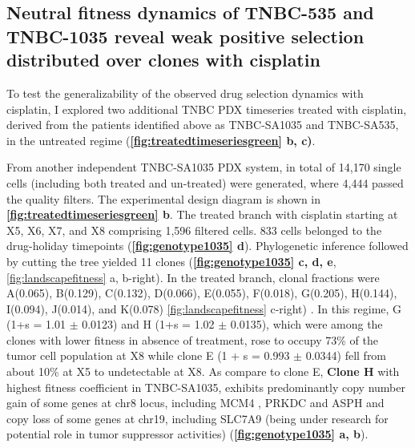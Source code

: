 
\subsection{Neutral fitness dynamics of TNBC-535 and TNBC-1035 reveal weak positive selection distributed over clones with cisplatin}
To test the generalizability of the observed drug selection dynamics with cisplatin, I explored two additional TNBC PDX timeseries treated with cisplatin, derived from the patients identified above as TNBC-SA1035 and TNBC-SA535, in the untreated regime  (\textbf{\autoref{fig:treatedtimeseriesgreen} b, c)}. 



From another independent TNBC-SA1035 PDX system, in total of 14,170 single cells (including both treated and un-treated) were generated, where 4,444 passed the quality filters. The experimental design diagram is shown in \textbf{\autoref{fig:treatedtimeseriesgreen} b}.
 The treated branch with cisplatin starting at X5, X6, X7, and X8 comprising 1,596 filtered cells. 833 cells belonged to the drug-holiday timepoints (\textbf{\autoref{fig:genotype1035} d}). Phylogenetic inference followed by cutting the tree yielded 11 clones (\textbf{\autoref{fig:genotype1035} c, d, e}, {\autoref{fig:landscapefitness} a, b-right}). In the treated branch, clonal fractions were A(0.065), B(0.129), C(0.132), D(0.066), E(0.055), F(0.018), G(0.205), H(0.144), I(0.094), J(0.014), and K(0.078) {\autoref{fig:landscapefitness} c-right}) . In this regime, G (1+s = 1.01 $\pm$ 0.0123) and H (1+s = 1.02 $\pm$ 0.0135), which were among the clones with lower fitness in absence of treatment, rose to occupy 73\% of the tumor cell population at X8 while clone E (1 + s = 0.993 $\pm$ 0.0344) fell from about 10\% at X5 to undetectable at X8. As compare to clone E,
 \textbf{Clone H} with highest fitness coefficient in TNBC-SA1035, exhibits predominantly copy number gain of some genes at chr8 locus, including MCM4 \cite {issac2019mcm2, stoeber2001dna, kwok2015prognostic}, PRKDC \cite {tan2020prkdc, sun2017prkdc, zhang2019prkdc} and ASPH and copy loss of some genes at chr19, including SLC7A9 (being under research for potential role in tumor suppressor activities) \cite {bhutia2016slc, ji2018function, broer2020amino, ganapathy2015slc5a8, gupta2006slc5a8} (\textbf{\autoref{fig:genotype1035} a, b}).
 
